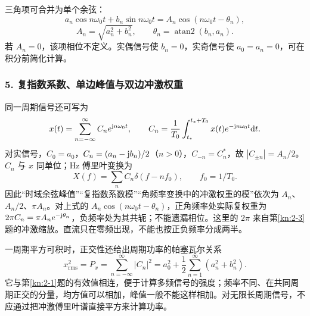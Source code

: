 三角项可合并为单个余弦：
\[
a_n\cos n\omega_0t+b_n\sin n\omega_0t
=A_n\cos(n\omega_0t-\theta_n),
\]
\[
A_n=\sqrt{a_n^2+b_n^2},\qquad \theta_n=\operatorname{atan2}(b_n,a_n).
\]
若 $A_n=0$，该项相位不定义。实偶信号使 $b_n=0$，实奇信号使 $a_0=a_n=0$，可在积分前简化计算。

\subsubsection*{5. 复指数系数、单边峰值与双边冲激权重}
同一周期信号还可写为
\[
x(t)=\sum_{n=-\infty}^{\infty}C_ne^{\mathrm{j} n\omega_0t},\qquad
C_n=\frac1{T_0}\int_{t_*}^{t_*+T_0}x(t)e^{-\mathrm{j} n\omega_0t}\mathrm{d} t.
\]
对实信号，$C_0=a_0$，$C_n=(a_n-\mathrm{j} b_n)/2$（$n>0$），$C_{-n}=C_n^*$，故 $|C_{\pm n}|=A_n/2$。$C_n$ 与 $x$ 同单位；Hz 傅里叶变换为
\[
X(f)=\sum_n C_n\delta(f-nf_0),\qquad f_0=1/T_0.
\]
因此“时域余弦峰值”“复指数系数模”“角频率变换中的冲激权重的模”依次为 $A_n$、$A_n/2$、$\pi A_n$。对上式的 $A_n\cos(n\omega_0t-\theta_n)$，正角频率处实际复权重为 $2\pi C_n=\pi A_ne^{-\mathrm{j}\theta_n}$，负频率处为其共轭；不能遗漏相位。这里的 $2\pi$ 来自第\ref{kn:2-3}题的冲激缩放。直流只在零频出现，不能也按正负频率分成两半。

一周期平方可积时，正交性还给出周期功率的帕塞瓦尔关系
\[
x_{\mathrm{rms}}^2=P_x=\sum_{n=-\infty}^{\infty}|C_n|^2
=a_0^2+\frac12\sum_{n=1}^\infty(a_n^2+b_n^2).
\]
它与第\ref{kn:2-1}题的有效值相连，便于计算多频信号的强度；频率不同、在共同周期正交的分量，均方值可以相加，峰值一般不能这样相加。对无限长周期信号，不应通过把冲激傅里叶谱直接平方来计算功率。


